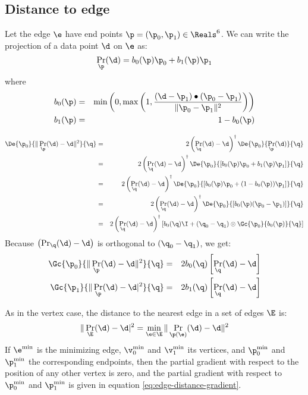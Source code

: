 \subsection{Distance to edge}
\label{sec:Distance-to-edge}

Let the edge $\e$ have end points $\p = (\p_0, \p_1) \in \Reals^6$.
We can write the projection of a data point $\d$ on $\e$ as:
\begin{equation}
\Pr_\p (\d) = b_0(\p) \p_0 + b_1(\p) \p_1
\end{equation}
where
\begin{eqnarray}
b_0(\p) & = &
\min\left(0,\max\left(1,
{{ (\d - \p_1) \bullet (\p_0 - \p_1) }
\over
{ \| \p_0 - \p_1 \|^2 }
}\right) \right) \\
b_1(\p) & = & 1 - b_0(\p)
\nonumber
\end{eqnarray}

\begin{eqnarray}
\label{eq:edge-distance-gradient-derivation}
\De{\p_0}{ \| \Pr_{\p} (\d) - \d \|^2 }{\q}
& = &
2 \left( \Pr_{\q} (\d) - \d \right)^\dagger
\De{\p_0}{\Pr_{\p} (\d) }{\q}
\\
& = &
2 \left( \Pr_{\q} (\d) - \d \right)^\dagger
\De{\p_0}{\left[ b_0(\p)\p_0 + b_1(\p)\p_1 \right]}{\q}
\nonumber \\
& = &
2 \left( \Pr_{\q} (\d) - \d \right)^\dagger
\De{\p_0}{\left[ b_0(\p)\p_0 + (1 - b_0(\p))\p_1 \right]}{\q}
\nonumber \\
& = &
2 \left( \Pr_{\q} (\d) - \d \right)^\dagger
\De{\p_0}{\left[ b_0(\p)(\p_0 - \p_1) \right]}{\q}
\nonumber \\
& = &
2 \left( \Pr_{\q} (\d) - \d \right)^\dagger
\left[ b_0(\q) \I + (\q_0 - \q_1) \otimes \Gc{\p_0}{b_0(\p)}{\q} \right]
\nonumber
\end{eqnarray}
Because $\left( \Pr_{\q} (\d) - \d \right)$ is orthogonal to
$\left( \q_0 - \q_1 \right)$, we get:
\begin{eqnarray}
\label{eq:edge-distance-gradient}
\Gc{\p_0}{ \| \Pr_{\p} (\d) - \d \|^2 }{\q}
& = & 2 b_0(\q) \left[ \Pr_{\q} (\d) - \d \right]
\\
\Gc{\p_1}{ \| \Pr_{\p} (\d) - \d|^2 }{\q}
& = & 2 b_1(\q) \left[ \Pr_\q (\d) - \d \right]
\nonumber
\end{eqnarray}

As in the vertex case,
the distance to the nearest edge in a set of edges $\E$ is:
\begin{equation}
\| \Pr_{\E} (\d) - \d|^2 = \min_{\e \in \E} \| \Pr_{\p(\e)}(\d) - \d \|^2
\end{equation}
If $\e^{\min}$ is the minimizing edge,
$\v_0^{\min}$ and $\v_1^{\min}$ its vertices,
and $\p_0^{\min}$ and $\p_1^{\min}$
the corresponding endpoints,
then the partial gradient with respect to
the position of any
other vertex is zero,
and the partial gradient with respect to $\p_0^{\min}$ and $\p_1^{\min}$
is given in equation \ref{eq:edge-distance-gradient}.

